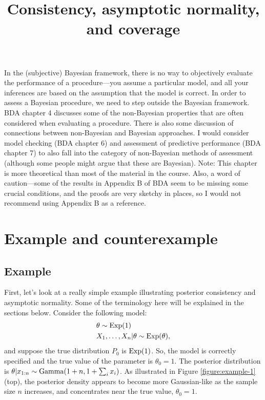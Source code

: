 \documentclass[12pt]{article}
\title{Consistency, asymptotic normality, and coverage}
\author{}
\date{}
\begin{document}
\maketitle

\tableofcontents
{}

\vspace{2em}

In the (subjective) Bayesian framework, there is no way to objectively evaluate the performance of a procedure---you assume a particular model, and all your inferences are based on the assumption that the model is correct.  In order to assess a Bayesian procedure, we need to step outside the Bayesian framework. BDA chapter 4 discusses some of the non-Bayesian properties that are often considered when evaluating a procedure. There is also some discussion of connections between non-Bayesian and Bayesian approaches.
I would consider model checking (BDA chapter 6) and assessment of predictive performance (BDA chapter 7) to also fall into the category of non-Bayesian methods of assessment (although some people might argue that these are Bayesian). 
Note: This chapter is more theoretical than most of the material in the course. Also, a word of caution---some of the results in Appendix B of BDA seem to be missing some crucial conditions, and the proofs are very sketchy in places, so I would not recommend using Appendix B as a reference.


\section{Example and counterexample}

\subsection{Example}

First, let's look at a really simple example illustrating posterior consistency and asymptotic normality. Some of the terminology here will be explained in the sections below. Consider the following model:
\begin{align*}
& \theta \sim \operatorname*{Exp}(1)\\
& X_1,\ldots,X_n | \theta \sim \operatorname*{Exp}(\theta),
\end{align*}
and suppose the true distribution $P_0$ is $\operatorname*{Exp}(1)$.  So, the model is correctly specified and the true value of the parameter is $\theta_0 = 1$. The posterior distribution is $\theta | x_{1:n} \sim\operatorname*{Gamma}(1+n,1+\sum_i x_i)$. As illustrated in Figure \ref{figure:example-1} (top), the posterior density appears to become more Gaussian-like as the sample size $n$ increases, and concentrates near the true value, $\theta_0 = 1$.
\end{document}

